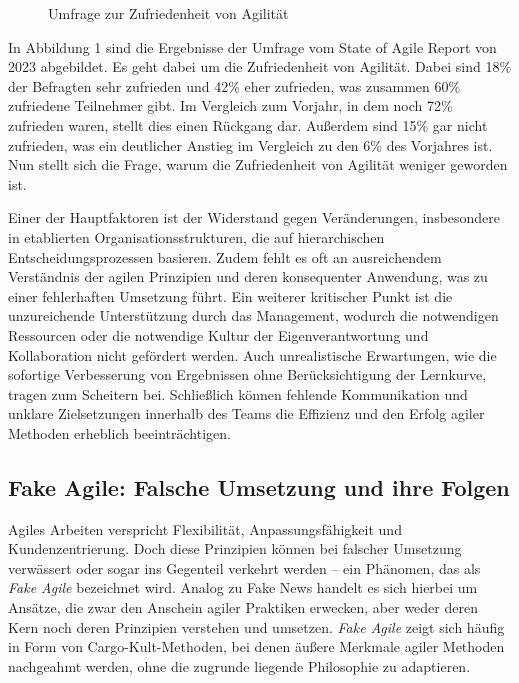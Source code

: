\documentclass[ngerman]{seminarvorlage}
\begin{document}
\begin{figure}[ht]
    \label{umfrage}
    \caption{Umfrage zur Zufriedenheit von Agilität}
\end{figure}

In Abbildung 1 sind die Ergebnisse der Umfrage vom State of Agile Report von 2023 abgebildet. Es geht dabei um die Zufriedenheit von Agilität. Dabei sind 18\% der Befragten sehr zufrieden und 42\% eher zufrieden, was zusammen 60\% zufriedene Teilnehmer gibt. Im Vergleich zum Vorjahr, in dem noch 72\% zufrieden waren, stellt dies einen Rückgang dar. Außerdem sind 15\% gar nicht zufrieden, was ein deutlicher Anstieg im Vergleich zu den 6\% des Vorjahres ist. Nun stellt sich die Frage, warum die Zufriedenheit von Agilität weniger geworden ist.

Einer der Hauptfaktoren ist der Widerstand gegen Veränderungen, insbesondere in etablierten Organisationsstrukturen, die auf hierarchischen Entscheidungsprozessen basieren. 
Zudem fehlt es oft an ausreichendem Verständnis der agilen Prinzipien und deren konsequenter Anwendung, was zu einer fehlerhaften Umsetzung führt. 
Ein weiterer kritischer Punkt ist die unzureichende Unterstützung durch das Management, wodurch die notwendigen Ressourcen oder die notwendige Kultur der Eigenverantwortung und Kollaboration nicht gefördert werden. 
Auch unrealistische Erwartungen, wie die sofortige Verbesserung von Ergebnissen ohne Berücksichtigung der Lernkurve, tragen zum Scheitern bei. Schließlich können fehlende Kommunikation und unklare Zielsetzungen innerhalb des Teams die Effizienz und den Erfolg agiler Methoden erheblich beeinträchtigen.

\subsection{Fake Agile: Falsche Umsetzung und ihre Folgen}

Agiles Arbeiten verspricht Flexibilität, Anpassungsfähigkeit und Kundenzentrierung. Doch diese Prinzipien können bei falscher Umsetzung verwässert oder sogar ins Gegenteil verkehrt werden – ein Phänomen, das als \textit{Fake Agile} bezeichnet wird. Analog zu \glqq Fake News\grqq{} handelt es sich hierbei um Ansätze, die zwar den Anschein agiler Praktiken erwecken, aber weder deren Kern noch deren Prinzipien verstehen und umsetzen. \textit{Fake Agile} zeigt sich häufig in Form von Cargo-Kult-Methoden, bei denen äußere Merkmale agiler Methoden nachgeahmt werden, ohne die zugrunde liegende Philosophie zu adaptieren.
\end{document}
